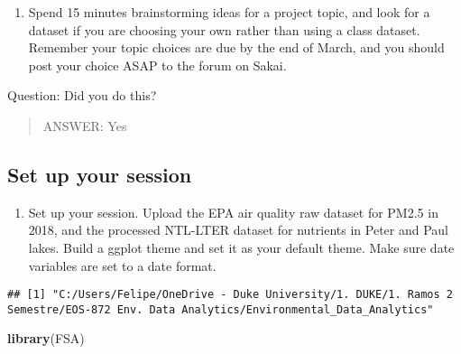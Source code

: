\documentclass[]{article}
\newenvironment{Shaded}{\begin{snugshade}}{\end{snugshade}}
\newcommand{\KeywordTok}[1]{\textcolor[rgb]{0.13,0.29,0.53}{\textbf{#1}}}
\newcommand{\DataTypeTok}[1]{\textcolor[rgb]{0.13,0.29,0.53}{#1}}
\newcommand{\OtherTok}[1]{\textcolor[rgb]{0.56,0.35,0.01}{#1}}
\newcommand{\OperatorTok}[1]{\textcolor[rgb]{0.81,0.36,0.00}{\textbf{#1}}}
\newcommand{\NormalTok}[1]{#1}
\providecommand{\tightlist}{%
  \setlength{\itemsep}{0pt}\setlength{\parskip}{0pt}}
\begin{document}
\begin{enumerate}
\def\labelenumi{\arabic{enumi}.}
\tightlist
\item
  Spend 15 minutes brainstorming ideas for a project topic, and look for
  a dataset if you are choosing your own rather than using a class
  dataset. Remember your topic choices are due by the end of March, and
  you should post your choice ASAP to the forum on Sakai.
\end{enumerate}

Question: Did you do this?

\begin{quote}
ANSWER: Yes
\end{quote}

\subsection{Set up your session}\label{set-up-your-session}

\begin{enumerate}
\def\labelenumi{\arabic{enumi}.}
\setcounter{enumi}{1}
\tightlist
\item
  Set up your session. Upload the EPA air quality raw dataset for PM2.5
  in 2018, and the processed NTL-LTER dataset for nutrients in Peter and
  Paul lakes. Build a ggplot theme and set it as your default theme.
  Make sure date variables are set to a date format.
\end{enumerate}

\begin{Shaded}
\end{Shaded}

\begin{verbatim}
## [1] "C:/Users/Felipe/OneDrive - Duke University/1. DUKE/1. Ramos 2 Semestre/EOS-872 Env. Data Analytics/Environmental_Data_Analytics"
\end{verbatim}

\begin{Shaded}
\begin{Highlighting}[]
\KeywordTok{library}\NormalTok{(FSA)}
\end{Highlighting}
\end{Shaded}
\end{document}
